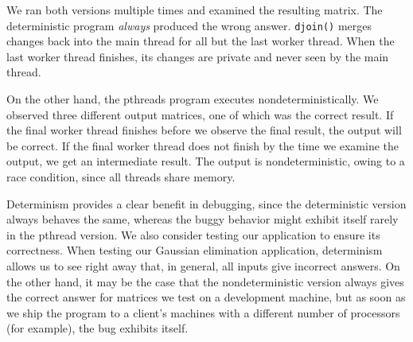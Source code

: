 

We ran both versions multiple times and examined the resulting matrix.
The deterministic program \emph{always}
produced the wrong answer. {\tt djoin()} merges changes back into the main
thread for all but the last worker thread. When the last worker thread
finishes, its changes are private and never seen by the main thread.

On the other hand, the pthreads program executes nondeterministically. We
observed three different output matrices, one of which was the correct result.
If the final worker thread finishes before we observe the final result, the
output will be correct. If the final worker thread does not finish by the time
we examine the output, we get an intermediate result. The output is
nondeterministic, owing to a race condition, since all threads share memory.

Determinism provides a clear benefit in debugging, since the deterministic
version always behaves the same, whereas the buggy behavior might exhibit itself
rarely in the pthread version.
We also consider testing our application to ensure its correctness.
When testing our Gaussian elimination application, determinism allows us to see
right away that, in general, all inputs give incorrect answers. On the other
hand, it may be the case that the nondeterministic version always gives
the correct answer for matrices we test on a development machine, but as soon as
we ship the program to a client's machines with a different number of processors
(for example), the bug exhibits itself.

\endinput

